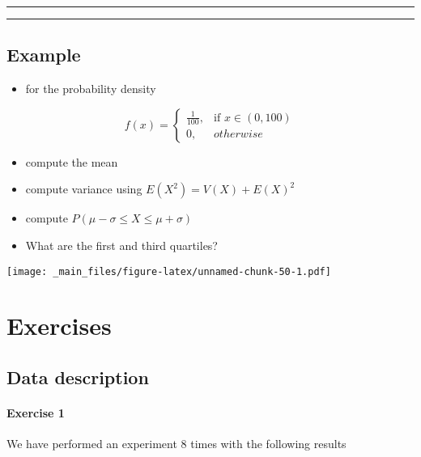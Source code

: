 \documentclass[
]{book}
\providecommand{\tightlist}{%
  \setlength{\itemsep}{0pt}\setlength{\parskip}{0pt}}
\begin{document}
\begin{center}\rule{0.5\linewidth}{0.5pt}\end{center}

\begin{center}\rule{0.5\linewidth}{0.5pt}\end{center}

\hypertarget{example-8}{%
\section{Example}\label{example-8}}

\begin{itemize}
\tightlist
\item
  for the probability density
\end{itemize}

\[
    f(x)= 
\begin{cases}
    \frac{1}{100},& \text{if } x\in (0,100)\\
    0,& otherwise 
\end{cases}
\]

\begin{itemize}
\tightlist
\item
  compute the mean
\item
  compute variance using \(E(X^2)=V(X)+E(X)^2\)
\item
  compute \(P(\mu-\sigma\leq X \leq \mu+\sigma)\)
\item
  What are the first and third quartiles?
\end{itemize}

\texttt{[image: \_main\_files/figure-latex/unnamed-chunk-50-1.pdf]}

\hypertarget{exercises}{%
\chapter{Exercises}\label{exercises}}

\hypertarget{data-description-1}{%
\section{Data description}\label{data-description-1}}

\hypertarget{exercise-1}{%
\subsubsection{Exercise 1}\label{exercise-1}}

We have performed an experiment 8 times with the following results
\end{document}
